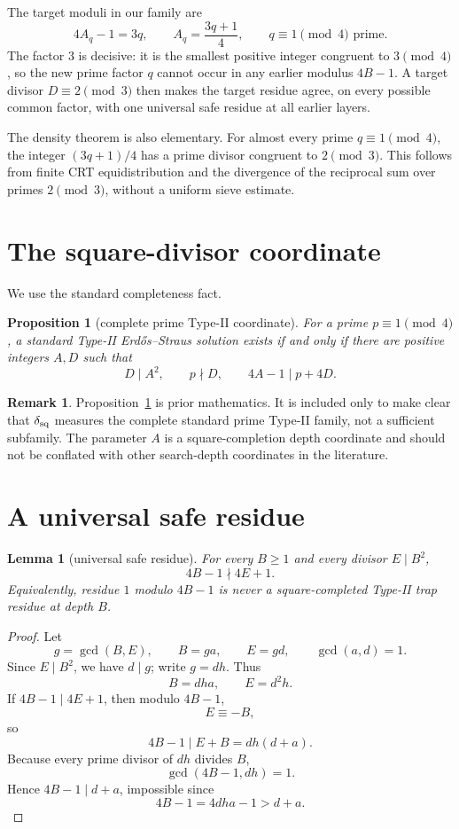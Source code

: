 \documentclass[11pt]{article}
\newtheorem{lemma}[theorem]{Lemma}
\newtheorem{proposition}[theorem]{Proposition}
\theoremstyle{definition}
\newtheorem{remark}[theorem]{Remark}
\begin{document}
The target moduli in our family are
\[
4A_q-1=3q,
\qquad
A_q=\frac{3q+1}{4},
\qquad q\equiv1\pmod4\text{ prime}.
\]
The factor $3$ is decisive: it is the smallest positive integer congruent to $3\pmod4$, so the new prime factor $q$ cannot occur in any earlier modulus $4B-1$.  A target divisor $D\equiv2\pmod3$ then makes the target residue agree, on every possible common factor, with one universal safe residue at all earlier layers.

The density theorem is also elementary.  For almost every prime $q\equiv1\pmod4$, the integer $(3q+1)/4$ has a prime divisor congruent to $2\pmod3$.  This follows from finite CRT equidistribution and the divergence of the reciprocal sum over primes $2\pmod3$, without a uniform sieve estimate.

\section{The square-divisor coordinate}
We use the standard completeness fact.

\begin{proposition}[complete prime Type-II coordinate]\label{prop:complete}
For a prime $p\equiv1\pmod4$, a standard Type-II Erd\H{o}s--Straus solution exists if and only if there are positive integers $A,D$ such that
\[
D\mid A^2,\qquad p\nmid D,\qquad 4A-1\mid p+4D.
\]
\end{proposition}

\begin{remark}
Proposition~\ref{prop:complete} is prior mathematics.  It is included only to make clear that $\delta_{\rm sq}$ measures the complete standard prime Type-II family, not a sufficient subfamily.  The parameter $A$ is a square-completion depth coordinate and should not be conflated with other search-depth coordinates in the literature.
\end{remark}

\section{A universal safe residue}
\begin{lemma}[universal safe residue]\label{lem:safe}
For every $B\ge1$ and every divisor $E\mid B^2$,
\[
4B-1\nmid4E+1.
\]
Equivalently, residue $1$ modulo $4B-1$ is never a square-completed Type-II trap residue at depth $B$.
\end{lemma}

\begin{proof}
Let
\[
g=\gcd(B,E),\qquad B=ga,\qquad E=gd,\qquad\gcd(a,d)=1.
\]
Since $E\mid B^2$, we have $d\mid g$; write $g=dh$.  Thus
\[
B=dha,\qquad E=d^2h.
\]
If $4B-1\mid4E+1$, then modulo $4B-1$,
\[
E\equiv-B,
\]
so
\[
4B-1\mid E+B=dh(d+a).
\]
Because every prime divisor of $dh$ divides $B$,
\[
\gcd(4B-1,dh)=1.
\]
Hence $4B-1\mid d+a$, impossible since
\[
4B-1=4dha-1>d+a.
\]
\end{proof}
\end{document}
